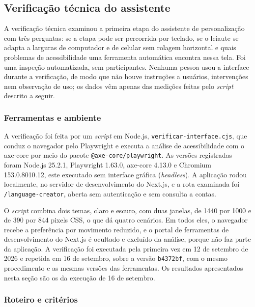 \subsection{Verificação técnica do assistente}
\label{subsec:verificacao-interface}

A verificação técnica examinou a primeira etapa do assistente de personalização com três perguntas: se a etapa pode ser percorrida por teclado, se o leiaute se adapta a larguras de computador e de celular sem rolagem horizontal e quais problemas de acessibilidade uma ferramenta automática encontra nessa tela. Foi uma inspeção automatizada, sem participantes. Nenhuma pessoa usou a interface durante a verificação, de modo que não houve instruções a usuários, intervenções nem observação de uso; os dados vêm apenas das medições feitas pelo \textit{script} descrito a seguir.

\subsubsection{Ferramentas e ambiente}

A verificação foi feita por um \textit{script} em Node.js, \texttt{verificar-interface.cjs}, que conduz o navegador pelo Playwright e executa a análise de acessibilidade com o axe-core por meio do pacote \texttt{@axe-core/playwright}. As versões registradas foram Node.js 25.2.1, Playwright 1.63.0, axe-core 4.13.0 e Chromium 153.0.8010.12, este executado sem interface gráfica (\textit{headless}). A aplicação rodou localmente, no servidor de desenvolvimento do Next.js, e a rota examinada foi \texttt{/language-creator}, aberta sem autenticação e sem consulta a contas.

O \textit{script} combina dois temas, claro e escuro, com duas janelas, de 1440 por 1000 e de 390 por 844 pixels CSS, o que dá quatro cenários. Em todos eles, o navegador recebe a preferência por movimento reduzido, e o portal de ferramentas de desenvolvimento do Next.js é ocultado e excluído da análise, porque não faz parte da aplicação. A verificação foi executada pela primeira vez em 12 de setembro de 2026 e repetida em 16 de setembro, sobre a versão \texttt{b4372bf}, com o mesmo procedimento e as mesmas versões das ferramentas. Os resultados apresentados nesta seção são os da execução de 16 de setembro.

\subsubsection{Roteiro e critérios}

